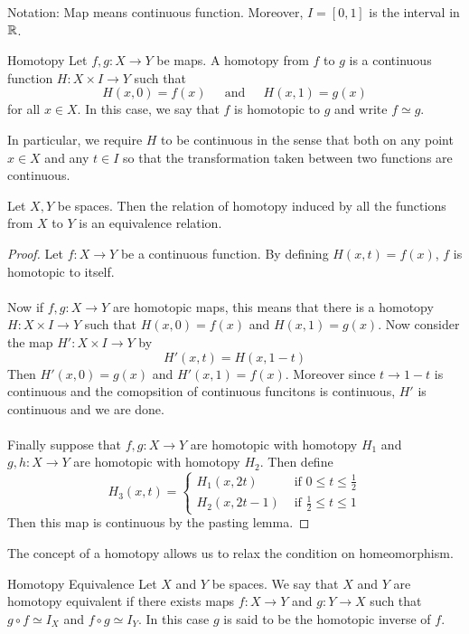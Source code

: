 \documentclass[a4paper]{article}
\begin{document}
Notation: Map means continuous function. Moreover, $I=[0,1]$ is the interval in $\mathbb{R}$. 

\begin{defn}{Homotopy}{} Let $f,g:X\to Y$ be maps. A homotopy from $f$ to $g$ is a continuous function $H:X\times I\to Y$ such that $$H(x,0)=f(x)\;\;\;\;\text{ and }\;\;\;\;H(x,1)=g(x)$$ for all $x\in X$. In this case, we say that $f$ is homotopic to $g$ and write $f\simeq g$. 
\end{defn}

In particular, we require $H$ to be continuous in the sense that both on any point $x\in X$ and any $t\in I$ so that the transformation taken between two functions are continuous. 

\begin{prp}{}{} Let $X,Y$ be spaces. Then the relation of homotopy induced by all the functions from $X$ to $Y$ is an equivalence relation. \tcbline
\begin{proof}
Let $f:X\to Y$ be a continuous function. By defining $H(x,t)=f(x)$, $f$ is homotopic to itself. \\~\\
Now if $f,g:X\to Y$ are homotopic maps, this means that there is a homotopy $H:X\times I\to Y$ such that $H(x,0)=f(x)$ and $H(x,1)=g(x)$. Now consider the map $H':X\times I\to Y$ by $$H'(x,t)=H(x,1-t)$$ Then $H'(x,0)=g(x)$ and $H'(x,1)=f(x)$. Moreover since $t\to 1-t$ is continuous and the comopsition of continuous funcitons is continuous, $H'$ is continuous and we are done. \\~\\
Finally suppose that $f,g:X\to Y$ are homotopic with homotopy $H_1$ and $g,h:X\to Y$ are homotopic with homotopy $H_2$. Then define $$H_3(x,t)=\begin{cases}
H_1(x,2t) & \text{ if } 0\leq t\leq\frac{1}{2}\\
H_2(x,2t-1) & \text{ if } \frac{1}{2}\leq t\leq 1
\end{cases}$$
Then this map is continuous by the pasting lemma. 
\end{proof}
\end{prp}

The concept of a homotopy allows us to relax the condition on homeomorphism. 

\begin{defn}{Homotopy Equivalence}{} Let $X$ and $Y$ be spaces. We say that $X$ and $Y$ are homotopy equivalent if there exists maps $f:X\to Y$ and $g:Y\to X$ such that $g\circ f\simeq I_X$ and $f\circ g\simeq I_Y$. In this case $g$ is said to be the homotopic inverse of $f$. 
\end{defn}
\end{document}
